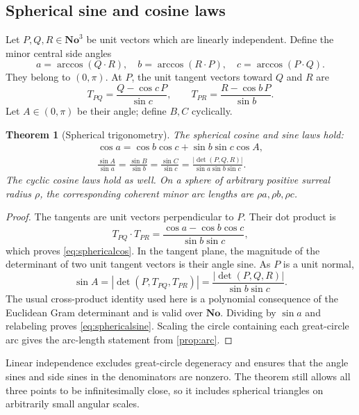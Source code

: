 \documentclass[11pt,letterpaper]{article}
\newtheorem{theorem}{Theorem}[section]
\theoremstyle{definition}
\theoremstyle{remark}
\newcommand{\No}{\mathbf{No}}
\numberwithin{equation}{section}
\begin{document}
\subsection{Spherical sine and cosine laws}
Let $P,Q,R\in\No^3$ be unit vectors which are linearly independent. Define the minor central side angles
\[
 a=\arccos(Q\cdot R),\quad b=\arccos(R\cdot P),\quad c=\arccos(P\cdot Q).
\]
They belong to $(0,\pi)$. At $P$, the unit tangent vectors toward $Q$ and $R$ are
\[
 T_{PQ}=\frac{Q-\cos c\,P}{\sin c},\qquad
 T_{PR}=\frac{R-\cos b\,P}{\sin b}.
\]
Let $A\in(0,\pi)$ be their angle; define $B,C$ cyclically.

\begin{theorem}[Spherical trigonometry]\label{thm:spherical}
The spherical cosine and sine laws hold:
\begin{gather}\label{eq:sphericalcos}
 \cos a=\cos b\cos c+\sin b\sin c\cos A,\\
 \frac{\sin A}{\sin a}=\frac{\sin B}{\sin b}
 =\frac{\sin C}{\sin c}
 =\frac{|\det(P,Q,R)|}{\sin a\sin b\sin c}.\label{eq:sphericalsine}
\end{gather}
The cyclic cosine laws hold as well. On a sphere of arbitrary positive surreal radius $\rho$, the corresponding coherent minor arc lengths are $\rho a,\rho b,\rho c$.
\end{theorem}
\begin{proof}
The tangents are unit vectors perpendicular to $P$. Their dot product is
\[
 T_{PQ}\cdot T_{PR}
 =\frac{\cos a-\cos b\cos c}{\sin b\sin c},
\]
which proves \eqref{eq:sphericalcos}. In the tangent plane, the magnitude of the determinant of two unit tangent vectors is their angle sine. As $P$ is a unit normal,
\[
 \sin A=|\det(P,T_{PQ},T_{PR})|
 =\frac{|\det(P,Q,R)|}{\sin b\sin c}.
\]
The usual cross-product identity used here is a polynomial consequence of the Euclidean Gram determinant and is valid over $\No$. Dividing by $\sin a$ and relabeling proves \eqref{eq:sphericalsine}. Scaling the circle containing each great-circle arc gives the arc-length statement from \cref{prop:arc}.
\end{proof}
Linear independence excludes great-circle degeneracy and ensures that the angle sines and side sines in the denominators are nonzero. The theorem still allows all three points to be infinitesimally close, so it includes spherical triangles on arbitrarily small angular scales.
\end{document}
